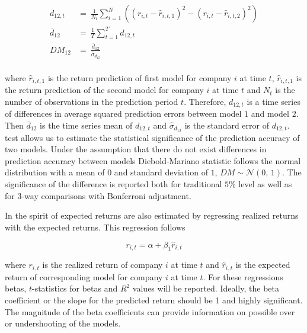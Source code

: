 \documentclass[12pt]{article}
\begin{document}
\begin{equation}
\label{eq:Diebold-Mariano}
\begin{split}
 d_{12, t} 			& = \ \frac{1}{N_{t}}  \sum^N_{i=1}((r_{i, t} - \hat r_{i, t, 1})^2 - (r_{i, t} - \hat r_{i, t, 2})^2) \\
\overline{d}_{12} 	& = \ \frac{1}{T} \sum^T_{t=1} d_{12, t} \\
DM_{12} 			& = \ \frac{\overline{d}_{12}}{\hat \sigma_{d_{12}}} \\
\end{split}
\end{equation}

where $\hat r_{i, t, 1}$ is the return prediction of first model for company $i$ at time $t$, $\hat r_{i, t, 1}$ is the return prediction of the second model  for company $i$ at time $t$ and $N_t$ is the number of observations in the prediction period $t$. Therefore, $d_{12, t}$ is a time series of differences in average squared prediction errors between model $1$ and model $2$. Then $\overline{d}_{12}$ is the time series mean of $d_{12, t}$ and $\hat \sigma_{d_{12}}$ is the \citet{Newey1987} standard error of $d_{12, t}$. \citet{Diebold1995} test allows us to estimate the statistical significance of the prediction accuracy of two models. Under the assumption that there do not exist differences in prediction accuracy between models Diebold-Mariano statistic follows the normal distribution with a mean of $0$ and standard deviation of $1$, $DM \sim \mathcal{N}(0,\, 1)$. The significance of the difference is reported both for traditional $5\%$ level as well as for 3-way comparisons with Bonferroni adjustment. \par

In the spirit of \citet{Lewellen2015} expected returns are also estimated by regressing realized returns with the expected returns. This regression follows \par

\begin{equation}
\label{eq:realizedRegression}
r_{i, t} = \alpha + \beta_1 \hat r_{i, t}
\end{equation}

where $r_{i, t}$ is the realized return of company $i$ at time $t$ and $\hat r_{i, t}$ is the expected return of corresponding model for company $i$ at time $t$. For these regressions betas, $t$-statistics for betas and $R^2$ values will be reported. Ideally, the beta coefficient or the slope for the predicted return should be 1 and highly significant. The magnitude of the beta coefficients can provide information on possible over or undershooting of the models. \par
\end{document}
